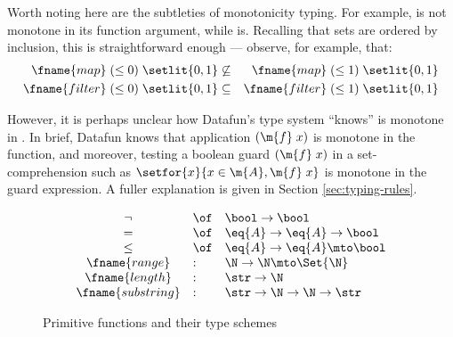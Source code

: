 Worth noting here are the subtleties of monotonicity typing. For example,
 is not monotone in its function argument, while  is.
Recalling that sets are ordered by inclusion, this is straightforward enough ---
observe, for example, that:
\begin{eqnarray*}
 \fname{map}\;(\le 0)\;\setlit{0,1}
 &\not\subseteq& \fname{map}\;(\le 1)\;\setlit{0,1}\\
 \fname{filter}\;(\le 0)\;\setlit{0,1}
 &\subseteq& \fname{filter}\;(\le 1)\;\setlit{0,1}
\end{eqnarray*}

However, it is perhaps unclear how Datafun's type system ``knows''
 is monotone in . In brief, Datafun knows that application
$(\m{f}\;x)$ is monotone in the function, and moreover, testing a boolean guard
$(\m{f}\;x)$ in a set-comprehension such as $\setfor{x}{x \in \m{A}, \m{f}\;x}$
is monotone in the guard expression. A fuller explanation is given in Section
\ref{sec:typing-rules}.





\begin{figure}
  \[\begin{array}{cll}
  \neg &\of& \bool \uto \bool\\
  =   &\of& \eq{A} \uto \eq{A} \uto \bool\\
  \le &\of& \eq{A} \uto \eq{A} \mto \bool\\
  \fname{range}    &:& \N \uto \N \mto \Set{\N}\\
  \fname{length}   &:& \str \uto \N\\
  \fname{substring} &:& \str \uto \N \uto \N \uto \str
  \end{array}\]
  \caption{Primitive functions and their type schemes}
  \label{fig:primitives}
\end{figure}

